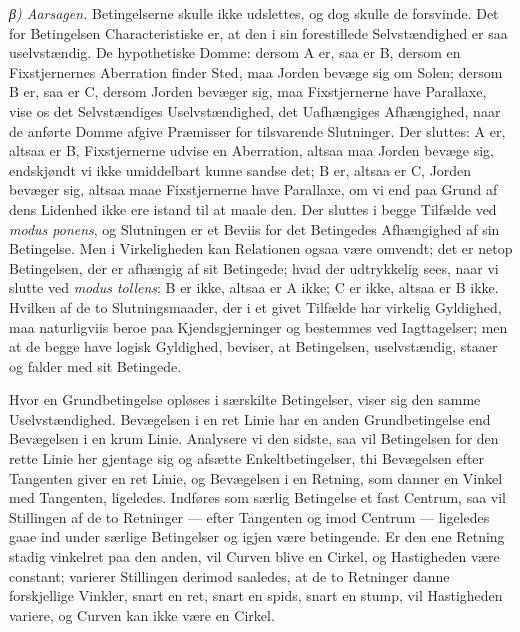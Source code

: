 \documentclass[12pt,a4paper]{book}
\newcommand{\subrunin}[1]{\emph{#1}\hspace{0.4em}}
\begin{document}
\subrunin{β) Aarsagen.} Betingelserne skulle ikke udslettes, og dog
skulle de forsvinde. Det for Betingelsen Characteristiske er, at den i
sin forestillede Selvstændighed er saa uselvstændig. De hypothetiske
Domme: dersom A er, saa er B, dersom en Fixstjernernes Aberration finder
Sted, maa Jorden bevæge sig om Solen; dersom B er, saa er C, dersom
Jorden bevæger sig, maa Fixstjernerne have Parallaxe, vise os det
Selvstændiges Uselvstændighed, det Uafhængiges Afhængighed, naar de
anførte Domme afgive Præmisser for tilsvarende Slutninger. Der sluttes: A
er, altsaa er B, Fixstjernerne udvise en Aberration, altsaa maa Jorden
bevæge sig, endskjøndt vi ikke umiddelbart kunne sandse det; B er, altsaa
er C, Jorden bevæger sig, altsaa maae Fixstjernerne have Parallaxe, om vi
end paa Grund af dens Lidenhed ikke ere istand til at maale den. Der
sluttes i begge Tilfælde ved \textit{modus ponens}, og Slutningen er et
Beviis for det Betingedes Afhængighed af sin Betingelse. Men i
Virkeligheden kan Relationen ogsaa være omvendt; det er netop
Betingelsen, der er afhængig af sit Betingede; hvad der udtrykkelig sees,
naar vi slutte ved \textit{modus tollens}: B er ikke, altsaa er A ikke; C
er ikke, altsaa er B ikke. Hvilken af de to Slutningsmaader, der i et
givet Tilfælde har virkelig Gyldighed, maa naturligviis beroe paa
Kjendsgjerninger og bestemmes ved Iagttagelser; men at de begge have
logisk Gyldighed, beviser, at Betingelsen, uselvstændig, staaer og falder
med sit Betingede.

Hvor en Grundbetingelse opløses i særskilte Betingelser,
viser sig den samme Uselvstændighed. Bevægelsen i en ret Linie har en
anden Grundbetingelse end Bevægelsen i en krum Linie. Analysere vi den
sidste, saa vil Betingelsen for den rette Linie her gjentage sig og
afsætte Enkeltbetingelser, thi Bevægelsen efter Tangenten giver en ret
Linie, og Bevægelsen i en Retning, som danner en Vinkel med Tangenten,
ligeledes. Indføres som særlig Betingelse et fast Centrum, saa vil
Stillingen af de to Retninger --- efter Tangenten og imod Centrum ---
ligeledes gaae ind under særlige Betingelser og igjen være betingende. Er
den ene Retning stadig vinkelret paa den anden, vil Curven blive en
Cirkel, og Hastigheden være constant; varierer Stillingen derimod
saaledes, at de to Retninger danne forskjellige Vinkler, snart en ret,
snart en spids, snart en stump, vil Hastigheden variere, og Curven kan
ikke være en Cirkel.
\end{document}
